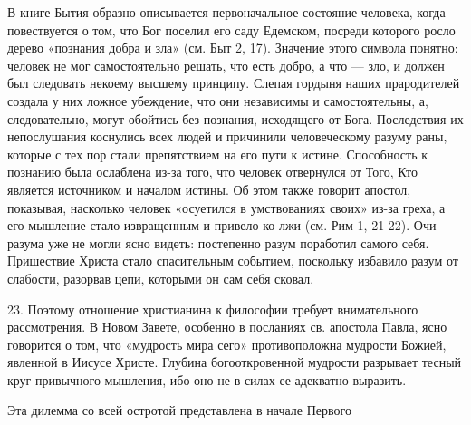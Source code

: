 \documentclass[a5paper,10pt]{article}
\begin{document}
В книге Бытия образно описывается первоначальное состояние человека, когда
повествуется о том, что Бог поселил его саду Едемском, посреди которого росло
дерево «познания добра и зла» (см. Быт 2, 17). Значение этого символа понятно:
человек не мог самостоятельно решать, что есть добро, а что — зло, и должен был
следовать некоему высшему принципу. Слепая гордыня наших прародителей создала у
них ложное убеждение, что они независимы и самостоятельны, а, следовательно,
могут обойтись без познания, исходящего от Бога. Последствия их непослушания
коснулись всех людей и причинили человеческому разуму раны, которые с тех пор
стали препятствием на его пути к истине. Способность к познанию была ослаблена
из-за того, что человек отвернулся от Того, Кто является источником и началом
истины. Об этом также говорит апостол, показывая, насколько человек «осуетился
в умствованиях своих» из-за греха, а его мышление стало извращенным и привело
ко лжи (см. Рим 1, 21-22). Очи разума уже не могли ясно видеть: постепенно
разум поработил самого себя. Пришествие Христа стало спасительным событием,
поскольку избавило разум от слабости, разорвав цепи, которыми он сам себя
сковал.

23. Поэтому отношение христианина к философии требует внимательного
рассмотрения. В Новом Завете, особенно в посланиях св. апостола Павла, ясно
говорится о том, что «мудрость мира сего» противоположна мудрости Божией,
явленной в Иисусе Христе. Глубина богооткровенной мудрости разрывает тесный
круг привычного мышления, ибо оно не в силах ее адекватно выразить.

Эта дилемма со всей остротой представлена в начале Первого
\end{document}
